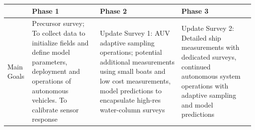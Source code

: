 \begin{table}[!t]
  \centering
  \footnotesize{
  \begin{tabular}{|p{4cm}|p{4cm}|p{4cm}|p{4cm}|}\hline 
    \rowcolor{Gray}
    \bfseries  &\bfseries Phase 1 &\bfseries Phase 2 &\bfseries Phase 3 \\
    \hline
    Main Goals& Precursor survey; To collect data to
                initialize fields and define model parameters,
                deployment and operations of autonomous vehicles. To
                calibrate sensor response& Update Survey 1: 
                                           AUV adaptive
                                           sampling operations;
                                           potential additional
                                           measurements using small boats
                                           and low cost measurements,
                                           model predictions to encapsulate
                                           high-res water-column surveys& Update Survey 2:
                                                                          Detailed
                                                                          ship
                                                                          measurements
                                                                          with
                                                                          dedicated
                                                                          surveys,
                                                                          continued
                                                                          autonomous system
                                                                          operations
                                                                          with
                                                                          adaptive
                                                                          sampling
                                                                          and
                                                                          model
                                                                          predictions\\
    \hline

\end{tabular}}
\end{table}
